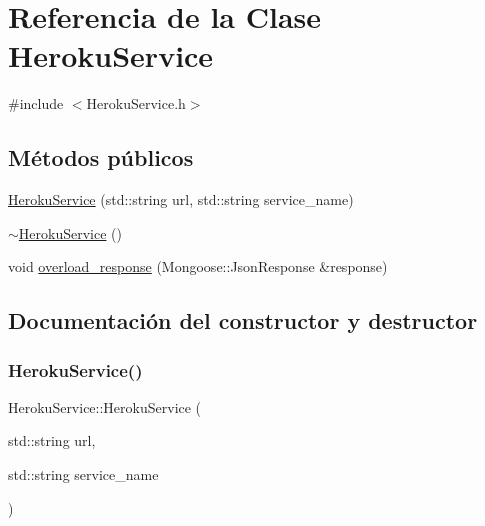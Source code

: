 \hypertarget{classHerokuService}{}\section{Referencia de la Clase Heroku\+Service}
\label{classHerokuService}


{\ttfamily \#include $<$Heroku\+Service.\+h$>$}

\subsection*{Métodos públicos}
\begin{DoxyCompactItemize}
\item 
\hyperlink{classHerokuService_ac1866f96b0b23540be3befcd16542882}{Heroku\+Service} (std\+::string url, std\+::string service\+\_\+name)
\item 
\hyperlink{classHerokuService_a14ce77044bdb9cca9f96ccbd69e508ca}{$\sim$\+Heroku\+Service} ()
\item 
void \hyperlink{classHerokuService_a7b6c411527e3315759e96652953d0914}{overload\+\_\+response} (Mongoose\+::\+Json\+Response \&response)
\end{DoxyCompactItemize}


\subsection{Documentación del constructor y destructor}
\mbox{\label{classHerokuService_ac1866f96b0b23540be3befcd16542882}} 
\subsubsection{\texorpdfstring{Heroku\+Service()}{HerokuService()}}
{\footnotesize\ttfamily Heroku\+Service\+::\+Heroku\+Service (\begin{DoxyParamCaption}\item[{std\+::string}]{url,  }\item[{std\+::string}]{service\+\_\+name }\end{DoxyParamCaption})}

\mbox{\label{classHerokuService_a14ce77044bdb9cca9f96ccbd69e508ca}} 
